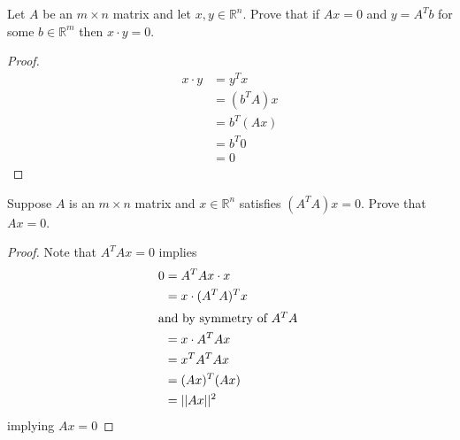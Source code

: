 \begin{exercise} \label{e1.4.29}
    Let \( A \) be an \( m \times n \) matrix and let \( x,y \in \mathbb{R}^n \). Prove that if \( Ax = 0 \) and \( y = A^Tb \) for some \( b \in \mathbb{R}^m \) then \( x \cdot y = 0 \).
    
    \begin{proof}
        \begin{align*}
            x \cdot y &= y^Tx \\
            &= \left( b^TA \right)x \\
            &= b^T\left(Ax\right) \\
            &= b^T 0 \\
            &= 0
        \end{align*}
    \end{proof}
\end{exercise} %

\begin{exercise} \label{e1.4.30}
\end{exercise} %

\begin{exercise} \label{e1.4.31}
\end{exercise} %

\begin{exercise} \label{e1.4.32}
    Suppose \( A \) is an \( m \times n \) matrix and \( x \in \mathbb{R}^n \) satisfies \( (A^TA)x = 0 \). Prove that \( Ax = 0 \).
    
    \begin{proof}
        Note that \( A^TAx = 0 \) implies
        \begin{align*}
            0 &= A^TAx \cdot x \\
            &= x \cdot (A^TA)^Tx \\
            \intertext{and by symmetry of \( A^TA \) }
            &= x \cdot A^TAx \\
            &= x^TA^TAx \\
            &= (Ax)^T(Ax) \\
            &= \vert \vert Ax \vert \vert^2
        \end{align*}
        implying \( Ax = 0 \)
    \end{proof}
\end{exercise} %

